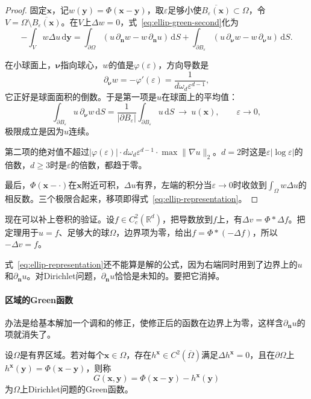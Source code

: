 \begin{proof}
固定$\bm{x}$，记$w(\bm{y})=\Phi(\bm{x}-\bm{y})$，取$\varepsilon$足够小使$\overline{B_\varepsilon(\bm{x})}\subset\Omega$，令$V=\Omega\setminus\overline{B_\varepsilon(\bm{x})}$。在$V$上$\Delta w=0$，式~\eqref{eq:ellip-green-second}化为
\[
 -\int_Vw\Delta u\,\mathrm{d}\bm{y}=\int_{\partial\Omega}(u\,\partial_{\bm{n}}w-w\,\partial_{\bm{n}}u)\,\mathrm{d}S+\int_{\partial B_\varepsilon}(u\,\partial_{\bm{\nu}}w-w\,\partial_{\bm{\nu}}u)\,\mathrm{d}S .
\]

在小球面上，$\bm{\nu}$指向球心，$w$的值是$\varphi(\varepsilon)$，方向导数是
\[
 \partial_{\bm{\nu}}w=-\varphi'(\varepsilon)=\frac1{d\omega_d\varepsilon^{d-1}},
\]
它正好是球面面积的倒数。于是第一项是$u$在球面上的平均值：
\[
 \int_{\partial B_\varepsilon}u\,\partial_{\bm{\nu}}w\,\mathrm{d}S=\frac1{\lvert\partial B_\varepsilon\rvert}\int_{\partial B_\varepsilon}u\,\mathrm{d}S\ \longrightarrow\ u(\bm{x}),\qquad\varepsilon\to0,
\]
极限成立是因为$u$连续。

第二项的绝对值不超过$\lvert\varphi(\varepsilon)\rvert\cdot d\omega_d\varepsilon^{d-1}\cdot\max\lVert\nabla u\rVert_2$。$d=2$时这是$\varepsilon\lvert\log\varepsilon\rvert$的倍数，$d\geq3$时是$\varepsilon$的倍数，都趋于零。

最后，$\Phi(\bm{x}-\cdot)$在$\bm{x}$附近可积，$\Delta u$有界，左端的积分当$\varepsilon\to0$时收敛到$\int_\Omega w\Delta u$的相反数。三个极限合起来，移项即得式~\eqref{eq:ellip-representation}。
\end{proof}

现在可以补上卷积的验证。设$f\in C_c^2(\mathbb{R}^{d})$，把导数放到$f$上，有$\Delta v=\Phi*\Delta f$。把定理用于$u=f$、足够大的球$\Omega$，边界项为零，给出$f=\Phi*(-\Delta f)$，所以$-\Delta v=f$。

式~\eqref{eq:ellip-representation}还不能算是解的公式，因为右端同时用到了边界上的$u$和$\partial_{\bm{n}}u$。对Dirichlet问题，$\partial_{\bm{n}}u$恰恰是未知的。要把它消掉。

\paragraph{区域的Green函数}
办法是给基本解加一个调和的修正，使修正后的函数在边界上为零，这样含$\partial_{\bm{n}}u$的项就消失了。

\begin{definition}[区域的Green函数]
\label{def:ellip-green-domain}
设$\Omega$是有界区域。若对每个$\bm{x}\in\Omega$，存在$h^{\bm{x}}\in C^2(\overline\Omega)$满足$\Delta h^{\bm{x}}=0$，且在$\partial\Omega$上$h^{\bm{x}}(\bm{y})=\Phi(\bm{x}-\bm{y})$，则称
\begin{equation}
 G(\bm{x},\bm{y})=\Phi(\bm{x}-\bm{y})-h^{\bm{x}}(\bm{y})
 \label{eq:ellip-green-domain}
\end{equation}
为$\Omega$上Dirichlet问题的Green函数。
\end{definition}

